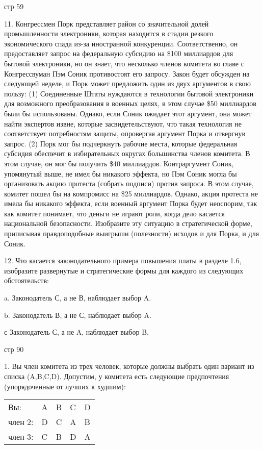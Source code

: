 \documentclass[a4paper,12pt]{article}
\begin{document}
стр 59

11. Конгрессмен Порк представляет район со
значительной долей промышленности электроники,
которая находится в стадии резкого экономического
спада из-за иностранной конкуренции.
Соответственно, он предоставляет запрос на
федеральную субсидию на \$100 миллиардов для
бытовой электроники, но он знает, что несколько
членов комитета во главе с Конгрессвуман Пэм Соник
противостоят его запросу. Закон будет обсужден на
следующей неделе, и Порк может предложить один из
двух аргументов в свою пользу: (1) Соединенные
Штаты нуждаются в технологии бытовой электроники
для возможного преобразования в военных целях, в
этом случае \$50 миллиардов были бы использованы.
Однако, если Соник ожидает этот аргумент, она может
найти экспертов извне, которые засвидетельствуют,
что такая технология не соответствует потребностям
защиты, опровергая аргумент Порка и отвергнув
запрос. (2) Порк мог бы подчеркнуть рабочие места,
которые федеральная субсидия обеспечит в
избирательных округах большинства членов комитета.
В этом случае, он мог бы получить \$40 миллиардов.
Контраргумент Соник, упомянутый выше, не имел бы
никакого эффекта, но Пэм Соник могла бы
организовать акцию протеста (собрать подписи)
против запроса. В этом случае, комитет пошел бы на
компромисс на \$25 миллиардов. Однако, акция
протеста не имела бы никакого эффекта, если военный
аргумент Порка будет неоспорим, так как комитет
понимает, что деньги не играют роли, когда дело
касается национальной безопасности. Изобразите эту
ситуацию в стратегической форме, приписывая
правдоподобные выигрыши (полезности) исходов и для
Порка, и для Соник.

12. Что касается законодательного примера повышения
платы в разделе 1.6, изобразите развернутые и
стратегические формы для каждого из следующих
обстоятельств:

a. Законодатель С, а не В, наблюдает выбор A.

b. Законодатель В, а не С, наблюдает выбор A.

с Законодатель С, а не A, наблюдает выбор B.

стр 90

1. Вы член комитета из трех человек, которые должны
выбрать один вариант из списка (A,B,C,D). Допустим,
у комитета есть следующие предпочтения
(упорядоченные от лучших к худшим):

\begin{tabular}{lllll}
Вы: & A & B & C & D \\ член 2: & D & C & A & B \\
член 3: & C & B & D & A\end{tabular}
\end{document}
